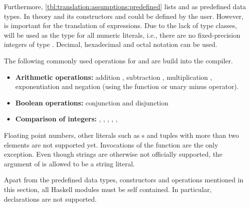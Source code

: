Furthermore, \autoref{tbl:translation:assumptions:predefined} lists  and  as predefined data types.
In theory  and its constructors  and  could be defined by the user.
However,  is important for the translation of  expressions.
Due to the lack of type classes,  will be used as the type for all numeric literals, i.e., there are no fixed-precision integers of type .
Decimal, hexadecimal and octal notation can be used.

The following commonly used operations for  and  are build into the compiler.
\begin{itemize}
  \item \textbf{Arithmetic operations:} addition \haskell{(+)}, subtraction \haskell{(-)}, multiplication \haskell{(*)}, exponentiation \haskell{(^)} and negation (using the  function or unary minus operator).
  \item \textbf{Boolean operations:} conjunction \haskell{(&&)} and disjunction \haskell{(||)}
  \item \textbf{Comparison of integers:} \haskell{(<=)}, \haskell{(<)}, \haskell{(==)}, \haskell{(/=)}, \haskell{(>=)}, \haskell{(>)}
\end{itemize}
Floating point numbers, other literals such as s and tuples with more than two elements are not supported yet.
Invocations of the  function are the only exception.
Even though strings are otherwise not officially supported, the argument of  is allowed to be a string literal.

Apart from the predefined data types, constructors and operations mentioned in this section, all Haskell modules must be self contained.
In particular,  declarations are not supported.

